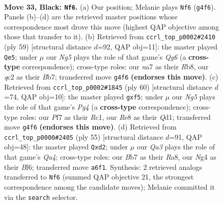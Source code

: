 \documentclass[11pt]{article}
\begin{document}
\clearpage

\begin{figure}[p]\centering
\begin{subfigure}{0.46\textwidth}\centering
\resizebox{\linewidth}{!}{%
\newchessgame
\chessboard[
  setfen={4rk2/Nb2rp2/qp6/3p2NP/P2P2n1/5KR1/2Q5/7R b - - 1 33},
  showmover=false,
  pgfstyle=straightmove, color=movearrow, markmove={g4-f6}
]}
\caption{}
\end{subfigure}\hfill
\begin{subfigure}{0.46\textwidth}\centering
\resizebox{\linewidth}{!}{%
\newchessgame
\chessboard[
  setfen={1r1r3k/1b4pp/p3B3/8/N3P3/P4pq1/1P3Q2/R2R1K2 b - - 2 30},
  showmover=false,
  pgfstyle=straightmove, color=movearrow, markmove={g3-e5}
]}
\caption{}
\end{subfigure}
\\[4pt]
\begin{subfigure}{0.46\textwidth}\centering
\resizebox{\linewidth}{!}{%
\newchessgame
\chessboard[
  setfen={1rr5/4q1kp/pp2n3/4pp2/1PP3P1/5B2/7P/1RRQ2K1 w - - 0 31},
  showmover=false,
  pgfstyle=straightmove, color=movearrow, markmove={g4-f5}
]}
\caption{}
\end{subfigure}\hfill
\begin{subfigure}{0.46\textwidth}\centering
\resizebox{\linewidth}{!}{%
\newchessgame
\chessboard[
  setfen={r1r2k2/5pp1/3R1b2/qB2pP2/P7/7P/1P1Q4/5R1K b - - 3 28},
  showmover=false,
  pgfstyle=straightmove, color=movearrow, markmove={a5-d2}
]}
\caption{}
\end{subfigure}
\caption{\textbf{Move 33, Black: \texttt{Nf6}.} (a) Our position; Melanie plays \texttt{Nf6} (\texttt{g4f6}). Panels (b)--(d) are the retrieved master positions whose correspondence most drove this move (highest QAP objective among those that transfer to it). (b) Retrieved from \texttt{ccrl\_top\_p0002\#2410} (ply 59) [structural distance $d$=92, QAP obj=11]: the master played \texttt{Qe5}; under $\mu$ our \emph{Ng5} plays the role of that game's \emph{Qg6} (a \textbf{cross-type} correspondence); cross-type roles: our \emph{n}a7 as their \emph{R}b8, our \emph{q}c2 as their \emph{B}b7; transferred move \texttt{g4f6} \textbf{(endorses this move)}. (c) Retrieved from \texttt{ccrl\_top\_p0002\#1845} (ply 60) [structural distance $d$=74, QAP obj=10]: the master played \texttt{gxf5}; under $\mu$ our \emph{Ng5} plays the role of that game's \emph{Pg4} (a \textbf{cross-type} correspondence); cross-type roles: our \emph{P}f7 as their \emph{R}c1, our \emph{R}e8 as their \emph{Q}d1; transferred move \texttt{g4f6} \textbf{(endorses this move)}. (d) Retrieved from \texttt{ccrl\_top\_p0000\#2405} (ply 55) [structural distance $d$=91, QAP obj=48]: the master played \texttt{Qxd2}; under $\mu$ our \emph{Qa3} plays the role of that game's \emph{Qa4}; cross-type roles: our \emph{B}b7 as their \emph{R}a8, our \emph{N}g4 as their \emph{B}f6; transferred move \texttt{a6f1}. Synthesis: 2 retrieved analogs transferred to \texttt{Nf6} (summed QAP objective 21, the strongest correspondence among the candidate moves); Melanie committed it via the \texttt{search} selector.}
\label{fig:thought-m65}
\end{figure}
\end{document}
